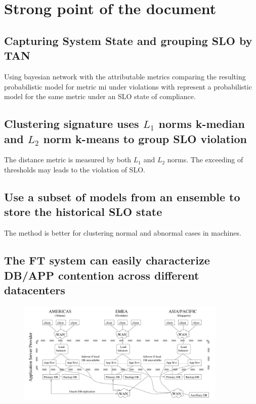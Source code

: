 \documentclass[acmlarge]{acmart}
\begin{document}



\maketitle
\section{Strong point of the document}
\subsection{Capturing System State and grouping SLO by TAN}
Using bayesian network with the attributable metrics comparing the resulting probabilistic model for metric mi under violations with represent a probabilistic model for the same metric under an SLO state of compliance.

\subsection{Clustering signature uses $L_{1}$ norms k-median and $L_{2}$ norm k-means to group SLO violation}
The distance metric is measured by both $L_{1}$ and $L_{2}$ norms. The exceeding of thresholds may leads to the violation of SLO.
\subsection{Use a subset of models from an ensemble to store the historical SLO state}
The method is better for clustering normal and abnormal cases in machines.
\subsection{The FT system can easily characterize DB/APP contention across different datacenters}
\begin{figure}
  \centering
  \includegraphics[width=10cm]{./app_provider.png}
  \end{figure}
\end{document}
